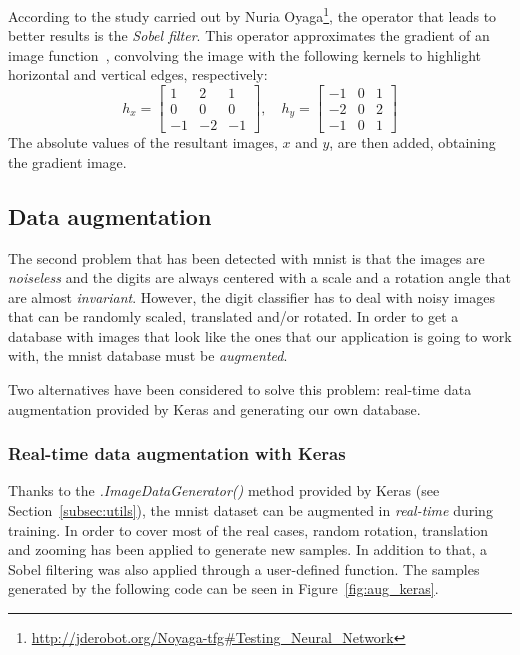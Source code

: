 According to the study carried out by Nuria Oyaga\footnote{\url{http://jderobot.org/Noyaga-tfg\#Testing\_Neural\_Network}}, the operator that leads to better results is the \emph{Sobel filter}. This operator approximates the gradient of an image function~\cite{sonka1999image}, convolving the image with the following kernels to highlight horizontal and vertical edges, respectively:  
\begin{equation}\label{eq:sobel}
h_x = 
\begin{bmatrix}
1 & 2 & 1\\
0 & 0 & 0\\
-1 & -2 & -1
\end{bmatrix}
,\quad
h_y = 
\begin{bmatrix}
-1 & 0 & 1\\
-2 & 0 & 2\\
-1 & 0 & 1
\end{bmatrix}
\end{equation}
The absolute values of the resultant images, $x$ and $y$, are then added, obtaining the gradient image.

\subsection{Data augmentation}
The second problem that has been detected with \gls{mnist} is that the images are \emph{noiseless} and the digits are always centered with a scale and a rotation angle that are almost \emph{invariant}. However, the digit classifier has to deal with noisy images that can be randomly scaled, translated and/or rotated. In order to get a database with images that look like the ones that our application is going to work with, the \gls{mnist} database must be \emph{augmented}.

Two alternatives have been considered to solve this problem: real-time data augmentation provided by Keras and generating our own database.

\subsubsection{Real-time data augmentation with Keras}
Thanks to the \textit{.ImageDataGenerator()} method provided by Keras (see Section~\ref{subsec:utils}), the \gls{mnist} dataset can be augmented in \emph{real-time} during training. In order to cover most of the real cases, random rotation, translation and zooming has been applied to generate new samples. In addition to that, a Sobel filtering was also applied through a user-defined function. The samples generated by the following code can be seen in Figure~\ref{fig:aug_keras}.

